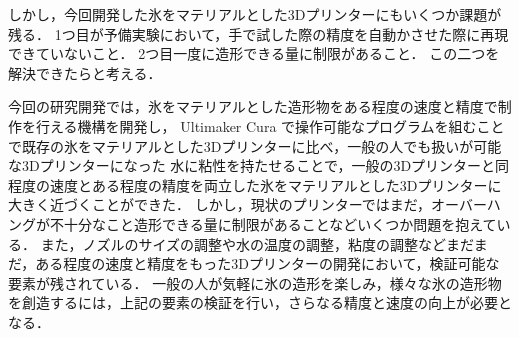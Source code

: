 しかし，今回開発した氷をマテリアルとした3Dプリンターにもいくつか課題が残る．
1つ目が予備実験において，手で試した際の精度を自動かさせた際に再現できていないこと．
2つ目一度に造形できる量に制限があること．
この二つを解決できたらと考える．

今回の研究開発では，氷をマテリアルとした造形物をある程度の速度と精度で制作を行える機構を開発し， Ultimaker Cura で操作可能なプログラムを組むことで既存の氷をマテリアルとした3Dプリンターに比べ，一般の人でも扱いが可能な3Dプリンターになった
水に粘性を持たせることで，一般の3Dプリンターと同程度の速度とある程度の精度を両立した氷をマテリアルとした3Dプリンターに大きく近づくことができた．
しかし，現状のプリンターではまだ，オーバーハングが不十分なこと造形できる量に制限があることなどいくつか問題を抱えている．
また，ノズルのサイズの調整や水の温度の調整，粘度の調整などまだまだ，ある程度の速度と精度をもった3Dプリンターの開発において，検証可能な要素が残されている．
一般の人が気軽に氷の造形を楽しみ，様々な氷の造形物を創造するには，上記の要素の検証を行い，さらなる精度と速度の向上が必要となる．









